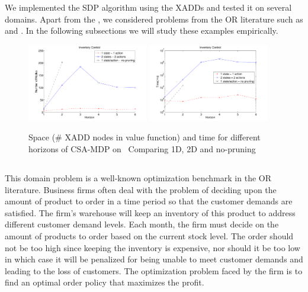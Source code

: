 \label{sec:results}
 
We implemented the SDP algorithm using the XADDs and tested it on several
domains. Apart from the \MarsRoverNL, we considered problems from the OR
literature such as \InventoryControl and \WaterReservoir. In the following
subsections we will study these examples empirically.
 
\begin{figure}[t]
\centering
\includegraphics[width=0.47\textwidth]{Figures1/space1-3.pdf}
\hspace{5mm}
\includegraphics[width=0.47\textwidth]{Figures1/time1-3.pdf}
\caption{\footnotesize
Space (\# XADD nodes in value function) and
time for different horizons of CSA-MDP on \InventoryControl\
Comparing 1D, 2D and no-pruning}
\label{fig:invC}
\end{figure}
 
\subsection{\InventoryControl}
This domain problem is a well-known optimization benchmark in the OR
literature. Business firms often deal with the problem of deciding upon the
amount of product to order in a time period so that the customer demands are
satisfied. The firm's warehouse will keep an inventory of this product to
address different customer demand levels. Each month, the firm must decide
on the amount of products to order based on the current stock level.
The order should not be too high since keeping the inventory is expensive,
nor should it be too low in which case it will be penalized for being unable
to meet customer demands and leading to the loss of customers. The
optimization problem faced by the firm is to find an optimal order policy
that maximizes the profit.~\cite{Mahootchi2009}
 
